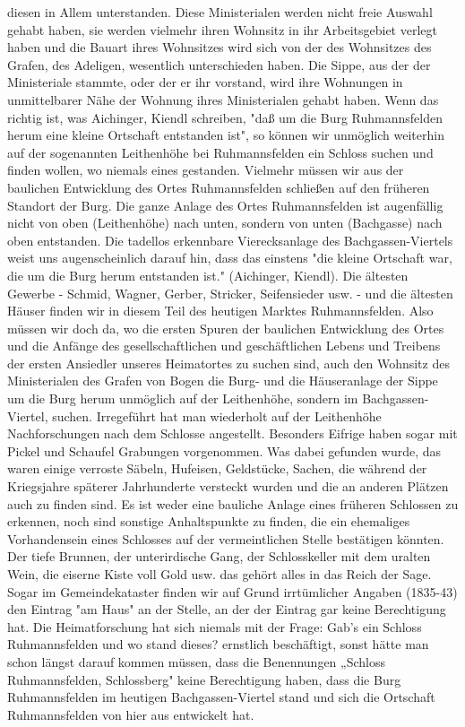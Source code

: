 \documentclass{book}
\begin{document}
diesen in Allem unterstanden. Diese Ministerialen werden nicht freie Auswahl
gehabt haben, sie werden vielmehr ihren Wohnsitz in ihr Arbeitsgebiet verlegt
haben und die Bauart ihres Wohnsitzes wird sich von der des Wohnsitzes des
Grafen, des Adeligen, wesentlich unterschieden haben. Die Sippe, aus der der
Ministeriale stammte, oder der er ihr vorstand, wird ihre Wohnungen in
unmittelbarer Nähe der Wohnung ihres Ministerialen gehabt haben. Wenn das
richtig ist, was Aichinger, Kiendl schreiben, "daß um die Burg Ruhmannsfelden
herum eine kleine Ortschaft entstanden ist", so können wir unmöglich weiterhin
auf der sogenannten Leithenhöhe bei Ruhmannsfelden ein Schloss suchen und finden
wollen, wo niemals eines gestanden. Vielmehr müssen wir aus der baulichen
Entwicklung des Ortes Ruhmannsfelden schließen auf den früheren Standort der
Burg. Die ganze Anlage des Ortes Ruhmannsfelden ist augenfällig nicht von oben
(Leithenhöhe) nach unten, sondern von unten (Bachgasse) nach oben entstanden.
Die tadellos erkennbare Vierecksanlage des Bachgassen-Viertels weist uns
augenscheinlich darauf hin, dass das einstens "die kleine Ortschaft war, die um
die Burg herum entstanden ist." (Aichinger, Kiendl). Die ältesten Gewerbe -
Schmid, Wagner, Gerber, Stricker, Seifensieder usw. - und die ältesten Häuser
finden wir in diesem Teil des heutigen Marktes Ruhmannsfelden. Also müssen wir
doch da, wo die ersten Spuren der baulichen Entwicklung des Ortes und die
Anfänge des gesellschaftlichen und geschäftlichen Lebens und Treibens der ersten
Ansiedler unseres Heimatortes zu suchen sind, auch den Wohnsitz des
Ministerialen des Grafen von Bogen die Burg- und die Häuseranlage der Sippe um
die Burg herum unmöglich auf der Leithenhöhe, sondern im Bachgassen-Viertel,
suchen. Irregeführt hat man wiederholt auf der Leithenhöhe Nachforschungen nach
dem Schlosse angestellt. Besonders Eifrige haben sogar mit Pickel und Schaufel
Grabungen vorgenommen. Was dabei gefunden wurde, das waren einige verroste
Säbeln, Hufeisen, Geldstücke, Sachen, die während der Kriegsjahre späterer
Jahrhunderte versteckt wurden und die an anderen Plätzen auch zu finden sind. Es
ist weder eine bauliche Anlage eines früheren Schlossen zu erkennen, noch sind
sonstige Anhaltspunkte zu finden, die ein ehemaliges Vorhandensein eines
Schlosses auf der vermeintlichen Stelle bestätigen könnten. Der tiefe Brunnen,
der unterirdische Gang, der Schlosskeller mit dem uralten Wein, die eiserne
Kiste voll Gold usw. das gehört alles in das Reich der Sage. Sogar im
Gemeindekataster finden wir auf Grund irrtümlicher Angaben (1835-43) den Eintrag
"am Haus" an der Stelle, an der der Eintrag gar keine Berechtigung hat. Die
Heimatforschung hat sich niemals mit der Frage: Gab’s ein Schloss Ruhmannsfelden
und wo stand dieses? ernstlich beschäftigt, sonst hätte man schon längst darauf
kommen müssen, dass die Benennungen „Schloss Ruhmannsfelden, Schlossberg" keine
Berechtigung haben, dass die Burg Ruhmannsfelden im heutigen Bachgassen-Viertel
stand und sich die Ortschaft Ruhmannsfelden von hier aus entwickelt hat.
\end{document}
